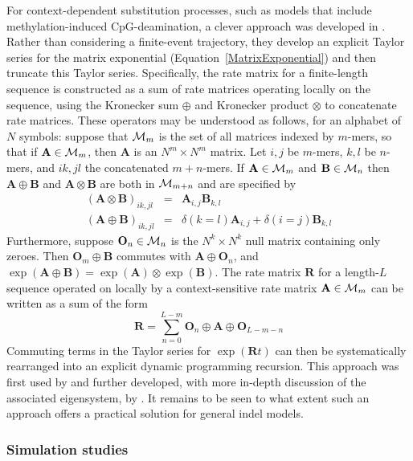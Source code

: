 \documentclass{bmcart}
\newcommand{\matr}[1]{\mathbf{#1}}
\newcommand{\eqref}[1]{Equation~\ref{#1}}
\newcommand{\ratematrix}{\matr{R}}
\begin{document}
For context-dependent substitution processes,
such as models that include methylation-induced CpG-deamination,
a clever approach was developed in \cite{LunterHein04}.
Rather than considering a finite-event trajectory, they develop an explicit Taylor series for the matrix exponential
(\eqref{MatrixExponential}) and then truncate this Taylor series.
\color{red}
Specifically, the rate matrix for a finite-length sequence is constructed
as a sum of rate matrices operating locally on the sequence, using the Kronecker sum $\oplus$
and Kronecker product $\otimes$ to concatenate rate matrices.
These operators may be understood as follows, for an alphabet of $N$ symbols:
suppose that ${\cal M}_m$ is the set of all matrices indexed by $m$-mers,
so that if $\matr{A} \in {\cal M}_m$, then $\matr{A}$ is an $N^m \times N^m$ matrix.
Let $i,j$ be $m$-mers, $k,l$ be $n$-mers, and $ik, jl$ the concatenated $m+n$-mers.
If $\matr{A} \in {\cal M}_m$ and $\matr{B} \in {\cal M}_n$
then $\matr{A} \oplus \matr{B}$ and $\matr{A} \otimes \matr{B}$ are both in ${\cal M}_{m+n}$
and are specified by
\begin{eqnarray}
  \left( \matr{A} \otimes \matr{B} \right)_{ik,jl} & = & \matr{A}_{i,j} \matr{B}_{k,l} \\
  \left( \matr{A} \oplus \matr{B} \right)_{ik,jl} & = & \delta(k=l) \matr{A}_{i,j} + \delta(i=j) \matr{B}_{k,l}
\end{eqnarray}
Furthermore, suppose $\matr{O}_n \in {\cal M}_n$ is the $N^k \times N^k$ null matrix containing only zeroes.
Then $\matr{O}_m \oplus \matr{B}$ commutes with $\matr{A} \oplus \matr{O}_n$,
and $\exp(\matr{A} \oplus \matr{B}) = \exp(\matr{A}) \otimes \exp(\matr{B})$.
The rate matrix $\ratematrix$ for a length-$L$ sequence operated on locally by a context-sensitive rate matrix $\matr{A} \in {\cal M}_m$ can be written as a sum of the form
\[
\ratematrix = \sum_{n=0}^{L-m} \matr{O}_n \oplus \matr{A} \oplus \matr{O}_{L-m-n}
\]
Commuting terms in the Taylor series for $\exp(\ratematrix t)$ can then be systematically rearranged into an explicit dynamic programming recursion.
This approach was first used by \cite{LunterHein04} and further developed, with more in-depth discussion of the associated eigensystem, by \cite{pmid21827770,pmid26135206}.
\color{black}
It remains to be seen to what extent such an approach offers a practical solution for general indel models.

\subsubsection*{Simulation studies}
\end{document}
